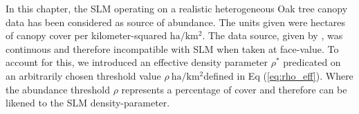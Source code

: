 


In this chapter, the SLM operating on a realistic heterogeneous Oak tree canopy data has been considered as source of abundance. %
The units given were hectares of canopy cover per kilometer-squared $\mathrm{ha/km^2}$. %
The data source, given by \cite{hill.data}, was continuous and therefore incompatible with SLM %
when taken at face-value. %
To account for this, we introduced an effective density parameter $\rho^*$ predicated on an %
arbitrarily chosen threshold value $\rho\ \mathrm{ha/km^2}$\textemdash defined in Eq (\ref{eq:rho_eff}). %
Where the abundance threshold $\rho$ represents a percentage of cover and therefore can be likened to the SLM density-parameter. %

